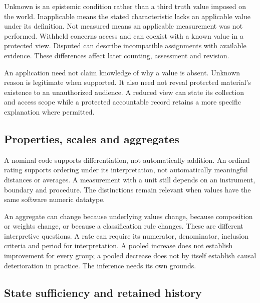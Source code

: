\documentclass[11pt,a4paper]{article}
\begin{document}
Unknown is an epistemic condition rather than a third truth value imposed on the world. Inapplicable means the stated characteristic lacks an applicable value under its definition. Not measured means an applicable measurement was not performed. Withheld concerns access and can coexist with a known value in a protected view. Disputed can describe incompatible assignments with available evidence. These differences affect later counting, assessment and revision.

An application need not claim knowledge of why a value is absent. Unknown reason is legitimate when supported. It also need not reveal protected material's existence to an unauthorized audience. A reduced view can state its collection and access scope while a protected accountable record retains a more specific explanation where permitted.

\subsection{Properties, scales and aggregates}

A nominal code supports differentiation, not automatically addition. An ordinal rating supports ordering under its interpretation, not automatically meaningful distances or averages. A measurement with a unit still depends on an instrument, boundary and procedure. The distinctions remain relevant when values have the same software numeric datatype.

An aggregate can change because underlying values change, because composition or weights change, or because a classification rule changes. These are different interpretive questions. A rate can require its numerator, denominator, inclusion criteria and period for interpretation. A pooled increase does not establish improvement for every group; a pooled decrease does not by itself establish causal deterioration in practice. The inference needs its own grounds.

\subsection{State sufficiency and retained history}
\end{document}
